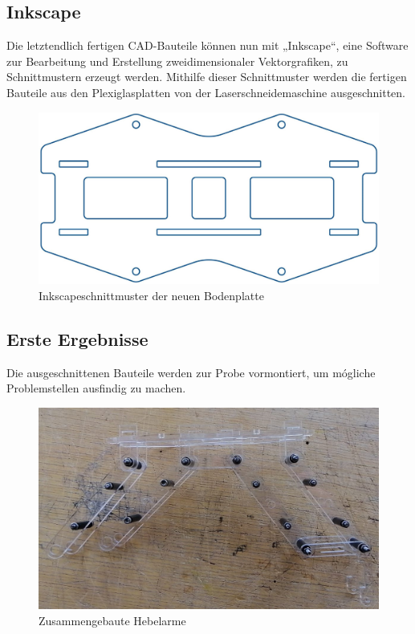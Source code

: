 \subsection{Inkscape}
Die letztendlich fertigen CAD-Bauteile können nun mit „Inkscape“, eine Software zur Bearbeitung und Erstellung zweidimensionaler Vektorgrafiken, zu Schnittmustern erzeugt werden. Mithilfe dieser Schnittmuster werden die fertigen Bauteile aus den Plexiglasplatten von der Laserschneidemaschine ausgeschnitten.

\begin{figure}
\begin{center}
\includegraphics[scale=0.5]{Grafiken/Inkscapebodenplatte.jpg}
\caption{Inkscapeschnittmuster der neuen Bodenplatte}
\label{inkscape1}
\end{center}
\end{figure}

\subsection{Erste Ergebnisse}
Die ausgeschnittenen Bauteile werden zur Probe vormontiert, um mógliche Problemstellen ausfindig zu machen.

\begin{figure}
\begin{center}
\includegraphics[scale=0.4]{Grafiken/Fotohebelarme.jpg}
\caption{Zusammengebaute Hebelarme}
\label{hebelarme}
\end{center}
\end{figure}

